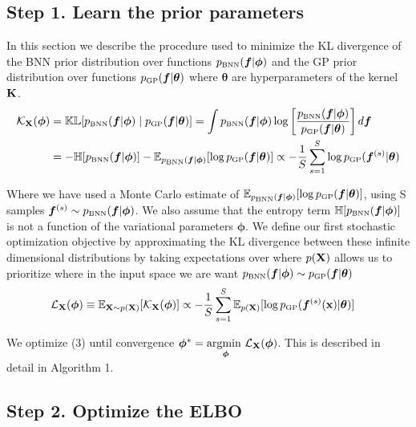 \documentclass{article}
\begin{document}
\subsection{Step 1. Learn the prior parameters}
In this section we describe the procedure used to minimize the KL divergence of  
the BNN prior distribution over functions $\pbnn (\bm f |  \bm \phi ) $ and
the GP prior distribution over functions  $\pgp (\bm f | \bm \theta )$ 
where $\bm \theta$ are hyperparameters of the kernel $ \mathbf{K} $. 
\begin{align}
    \mathcal K_\X (\bm \phi)&= 
    \kl [\pbnn (\bm f |  \bm \phi ) \mid   \pgp (\bm f | \bm \theta )] 
    = \int\pbnn (\bm f |  \bm \phi ) \log \BB{\frac{\pbnn (\bm f |  \bm \phi ) }{   \pgp (\bm f | \bm \theta )}} d\bm f  \\
    &= -\entropy [\pbnn (\bm f |  \bm \phi ) ] 
       - \E_{\pbnn (\bm f |  \bm \phi ) } [\log \pgp (\bm f | \bm \theta ) ] 
    \propto -\frac{1}{S} \sum_{s=1}^S \log \pgp (\bm f ^{(s)}| \bm \theta ) 
\end{align}

Where we have used a Monte Carlo estimate of 
$ \E_{\pbnn (\bm f |  \bm \phi ) } [\log \pgp (\bm f | \bm \theta ) ]$, 
using S samples $ \bm f ^{(s)} \sim  \pbnn (\bm f |  \bm \phi )$.
We also assume that the entropy term $\entropy [\pbnn (\bm f |  \bm \phi ) ]$ 
is not a function of the variational parameters $\bm \phi$.
We define our first stochastic optimization objective by approximating the KL divergence between these infinite dimensional distributions by taking expectations over where $p( \mathbf{X} )$ allows us to prioritize 
where in the input space we are want $\pbnn (\bm f |  \bm \phi ) \sim \pgp (\bm f | \bm \theta ) $
\begin{align}
     \elbo _\X (\bm \phi)
     &\equiv \E _{\X \sim p(\X)} [\mathcal K_\X (\bm \phi) ]
     \propto - \frac{1}{S} \sum_{s=1}^S  \E_{p(\B X)} [\log \pgp (\bm f ^{(s)}(\B x)| \bm \theta )] 
\end{align}


We optimize (3) until convergence $ \bm \phi ^* =  \underset{\bm \phi}{\text{argmin }}  \mathcal{L} _{ \mathbf{X} } (\bm \phi ) $.
This is described in detail in Algorithm 1. 

\subsection{Step 2. Optimize the ELBO}
\end{document}
